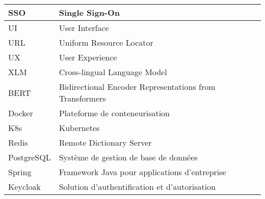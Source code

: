 \begin{center}
\begin{tabularx}{\textwidth}{|l|X|}
\hline
SSO & Single Sign-On \\
\hline
UI & User Interface \\
\hline
URL & Uniform Resource Locator \\
\hline
UX & User Experience \\
\hline
XLM & Cross-lingual Language Model \\
\hline
BERT & Bidirectional Encoder Representations from Transformers \\
\hline
Docker & Plateforme de conteneurisation \\
\hline
K8s & Kubernetes \\
\hline
Redis & Remote Dictionary Server \\
\hline
PostgreSQL & Système de gestion de base de données \\
\hline
Spring & Framework Java pour applications d'entreprise \\
\hline
Keycloak & Solution d'authentification et d'autorisation \\
\hline
\end{tabularx}
\end{center}
